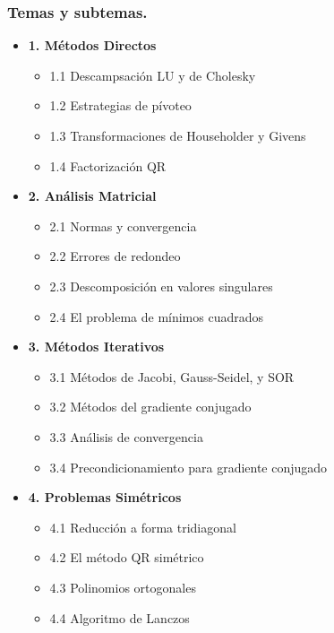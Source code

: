 \documentclass[10pt,a4paper]{article}
\begin{document}
\subsubsection{Temas y subtemas.}
\begin{itemize}
    \item \textbf{1. Métodos Directos}
    \begin{itemize}
        \item 1.1 Descampsación LU y de Cholesky
        \item 1.2 Estrategias de pívoteo
        
        \item 1.3 Transformaciones de Householder y Givens
        \item 1.4 Factorización QR
    \end{itemize}

    \item \textbf{2. Análisis Matricial}
    \begin{itemize}
        \item 2.1 Normas y convergencia
        \item 2.2 Errores de redondeo
        \item 2.3 Descomposición en valores singulares
        \item 2.4 El problema de mínimos cuadrados
    \end{itemize}

    \item \textbf{3. Métodos Iterativos}
    \begin{itemize}
        \item 3.1 Métodos de Jacobi, Gauss-Seidel, y SOR
        \item 3.2 Métodos del gradiente conjugado
        \item 3.3 Análisis de convergencia
        \item 3.4 Precondicionamiento para gradiente conjugado
    \end{itemize}

    \item \textbf{4. Problemas Simétricos}
    \begin{itemize}
        \item 4.1 Reducción a forma tridiagonal
        \item 4.2 El método QR simétrico
        \item 4.3 Polinomios ortogonales
        \item 4.4 Algoritmo de Lanczos
    \end{itemize}


\end{itemize}
\end{document}
